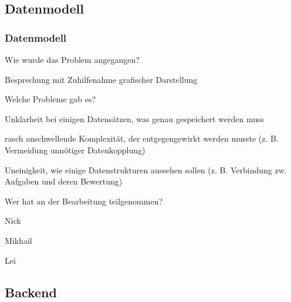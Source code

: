\documentclass{beamer}
\begin{document}
\subsection{Datenmodell}
\begin{frame}
    \frametitle{Datenmodell}
    \begin{description}[font=$\bullet$]
        \item Wie wurde das Problem angegangen?
              \begin{description}[font=$\bullet$]
                  \item Besprechung mit Zuhilfenahme grafischer Darstellung
              \end{description}

        \item Welche Probleme gab es?

              \begin{description}[font=$\bullet$]
                  \item Unklarheit bei einigen Datensätzen, was genau gespeichert werden muss
                  \item rasch anschwellende Komplexität, der entgegengewirkt werden musste (z. B. Vermeidung unnötiger Datenkopplung)
                  \item Uneinigkeit, wie einige Datenstrukturen aussehen sollen (z. B. Verbindung zw. Aufgaben und deren Bewertung)
              \end{description}

        \item Wer hat an der Bearbeitung teilgenommen?

              \begin{description}[font=$\bullet$]
                  \item Nick
                  \item Mikhail
                  \item Lei
              \end{description}
    \end{description}
\end{frame}
\subsection{Backend}
\end{document}
